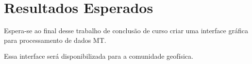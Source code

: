 \chapter{Resultados Esperados}
    \label{cap-resultados}
    Espera-se ao final desse trabalho de conclusão de curso criar uma interface gráfica para processamento de dados MT.
    
    Essa interface será disponibilizada para a comunidade geofísica.
